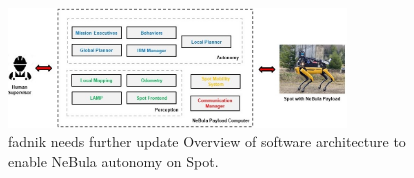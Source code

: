 \documentclass[a4paper, 10pt, conference]{ieeeconf}      %
\newcommand{\ph}[1]{{\textbf{#1}:}} %
\newcommand{\todo}[1]{{\color{red} #1 }} %
\newcommand{\inst}[1]{{\color{orange} #1 }} %
\begin{document}



\begin{figure}[h!]
  \centering
  \includegraphics[width=0.8\textwidth]{spot_sa.jpg}
  \caption{\todo{fadnik} \inst{needs further update} Overview of software architecture to enable NeBula autonomy on Spot.}
  \label{fig:spot_sysarch}
\end{figure}
\end{document}
